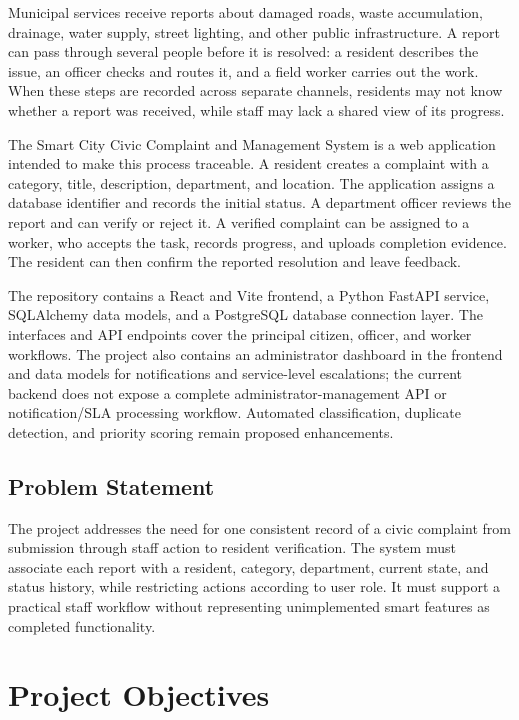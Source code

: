\documentclass[12pt,a4paper]{report}
\begin{document}
Municipal services receive reports about damaged roads, waste accumulation, drainage, water supply, street lighting, and other public infrastructure. A report can pass through several people before it is resolved: a resident describes the issue, an officer checks and routes it, and a field worker carries out the work. When these steps are recorded across separate channels, residents may not know whether a report was received, while staff may lack a shared view of its progress.

The Smart City Civic Complaint and Management System is a web application intended to make this process traceable. A resident creates a complaint with a category, title, description, department, and location. The application assigns a database identifier and records the initial status. A department officer reviews the report and can verify or reject it. A verified complaint can be assigned to a worker, who accepts the task, records progress, and uploads completion evidence. The resident can then confirm the reported resolution and leave feedback.

The repository contains a React and Vite frontend, a Python FastAPI service, SQLAlchemy data models, and a PostgreSQL database connection layer. The interfaces and API endpoints cover the principal citizen, officer, and worker workflows. The project also contains an administrator dashboard in the frontend and data models for notifications and service-level escalations; the current backend does not expose a complete administrator-management API or notification/SLA processing workflow. Automated classification, duplicate detection, and priority scoring remain proposed enhancements.

\subsection{Problem Statement}

The project addresses the need for one consistent record of a civic complaint from submission through staff action to resident verification. The system must associate each report with a resident, category, department, current state, and status history, while restricting actions according to user role. It must support a practical staff workflow without representing unimplemented smart features as completed functionality.

\section{Project Objectives}
\end{document}
